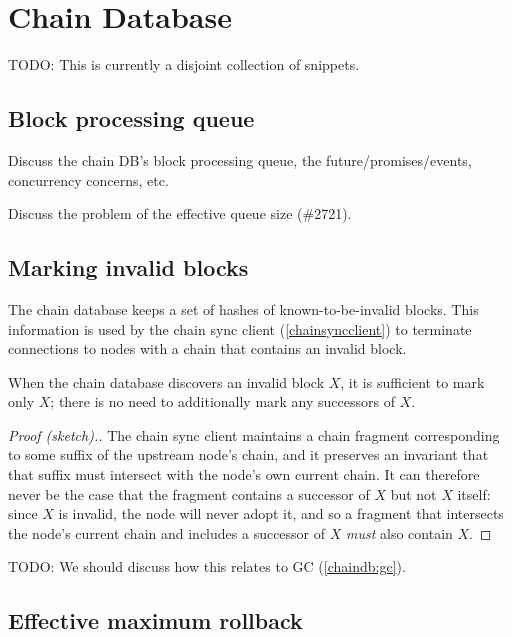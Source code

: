\chapter{Chain Database}
\label{chaindb}

TODO: This is currently a disjoint collection of snippets.

\section{Block processing queue}
\label{chaindb:queue}

Discuss the chain DB's block processing queue, the future/promises/events,
concurrency concerns, etc.

Discuss the problem of the effective queue size (\#2721).

\section{Marking invalid blocks}
\label{chaindb:invalidblocks}

The chain database keeps a set of hashes of known-to-be-invalid blocks.
This information is used by the chain sync client (\cref{chainsyncclient}) to
terminate connections to nodes with a chain that contains an invalid block.

\begin{lemma}
\label{chaindb:dont-mark-invalid-successors}
When the chain database discovers an invalid block $X$, it is sufficient
to mark only $X$; there is no need to additionally mark any successors of $X$.
\end{lemma}

\begin{proof}[Proof (sketch).]
The chain sync client maintains a chain fragment corresponding to some suffix
of the upstream node's chain, and it preserves an invariant that that suffix
must intersect with the node's own current chain. It can therefore never be
the case that the fragment contains a successor of $X$ but not $X$ itself:
since $X$ is invalid, the node will never adopt it, and so a fragment that
intersects the node's current chain and includes a successor of $X$ \emph{must}
also contain $X$.
\end{proof}

TODO: We should discuss how this relates to GC (\cref{chaindb:gc}).

\section{Effective maximum rollback}

